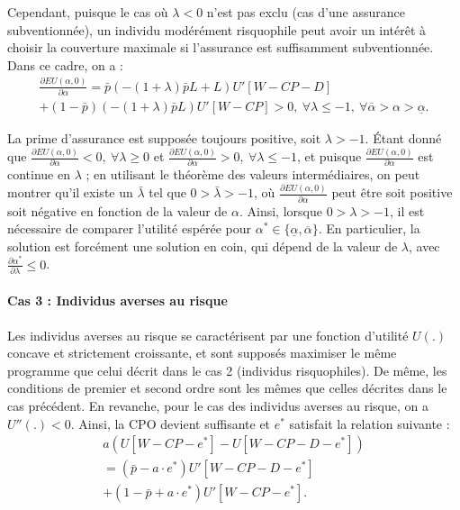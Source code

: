 \begin{Article}
\begin{refsection}[Mouminoux]
\begin{appendices}
Cependant, puisque le cas où $\lambda<0$ n'est pas exclu (cas d'une assurance subventionnée), un individu modérément risquophile peut avoir un intérêt à choisir la couverture maximale si l'assurance est suffisamment subventionnée.
Dans ce cadre, on a :
\begin{multline}
\frac{\partial EU(\alpha, 0)}{\partial \alpha}=\bar{p}(-(1+\lambda)\bar{p}L+L)U'[W -CP - D] \\
+ (1 - \bar{p})(-(1 + \lambda)\bar{p}L)U'[W - CP] >0, ~\forall \lambda \leq -1 ,~\forall \overline \alpha >\alpha >\underline \alpha. 
\end{multline}

La prime d'assurance est supposée toujours positive, soit $\lambda>-1$. Étant donné que $\frac{\partial EU(\alpha, 0)}{\partial \alpha}<0,~\forall \lambda \geq 0$ et $\frac{\partial EU(\alpha, 0)}{\partial \alpha}>0, ~\forall \lambda \leq -1$, et puisque $\frac{\partial EU(\alpha, 0)}{\partial \alpha}$ est continue en $\lambda$ ; en utilisant le théorème des valeurs intermédiaires, on peut montrer qu'il existe un $\bar{\lambda}$ tel que $0 > \bar{\lambda} > -1$, où $\frac{\partial EU(\alpha, 0)}{\partial \alpha}$ peut être soit positive soit négative en fonction de la valeur de $\alpha$. Ainsi, lorsque $0 > \lambda > -1$, il est nécessaire de comparer l'utilité espérée pour $\alpha^* \in \{\underline{\alpha}, \overline{\alpha}\}$. En particulier, la solution est forcément une solution en coin, qui dépend de la valeur de $\lambda$, avec $\frac{\partial \alpha^*}{\partial \lambda} \le 0$.

\paragraph*{Cas 3 : Individus averses au risque}

Les individus averses au risque se caractérisent par une fonction d'utilité $U(.)$ concave et strictement croissante, et sont supposés maximiser le même programme que celui décrit dans le cas 2 (individus risquophiles). De même, les conditions de premier et second ordre sont les mêmes que celles décrites dans le cas précédent. En revanche, pour le cas des individus averses au risque, on a $U''(.)<0$. Ainsi, la CPO devient suffisante et $e^*$ satisfait la relation suivante : 
\begin{multline}
 a(U[W - CP -e^*] -U[W - CP -D -e^*]) \\
 = (\bar{p}-a\cdot e^*)U'[W - CP -D -e^*] \\
 +(1 - \bar{p}+a\cdot e^*)U'[W - CP -e^*].
\end{multline} 
 

\end{appendices}
\end{refsection}
\end{Article}

